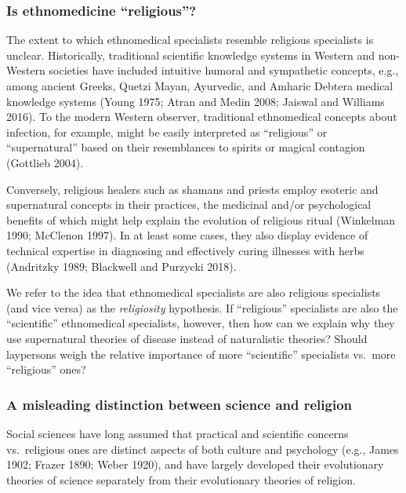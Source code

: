 \documentclass[
  11pt,
]{article}
\begin{document}
\hypertarget{is-ethnomedicine-religious}{%
\subsubsection{Is ethnomedicine ``religious''?}\label{is-ethnomedicine-religious}}

The extent to which ethnomedical specialists resemble religious specialists is unclear. Historically, traditional scientific knowledge systems in Western and non-Western societies have included intuitive humoral and sympathetic concepts, e.g., among ancient Greeks, Quetzi Mayan, Ayurvedic, and Amharic Debtera medical knowledge systems (Young 1975; Atran and Medin 2008; Jaiswal and Williams 2016). To the modern Western observer, traditional ethnomedical concepts about infection, for example, might be easily interpreted as ``religious'' or ``supernatural'' based on their resemblances to spirits or magical contagion (Gottlieb 2004).

Conversely, religious healers such as shamans and priests employ esoteric and supernatural concepts in their practices, the medicinal and/or psychological benefits of which might help explain the evolution of religious ritual (Winkelman 1990; McClenon 1997). In at least some cases, they also display evidence of technical expertise in diagnosing and effectively curing illnesses with herbs (Andritzky 1989; Blackwell and Purzycki 2018).

We refer to the idea that ethnomedical specialists are also religious specialists (and vice versa) as the \emph{religiosity} hypothesis. If ``religious'' specialists are also the ``scientific'' ethnomedical specialists, however, then how can we explain why they use supernatural theories of disease instead of naturalistic theories? Should laypersons weigh the relative importance of more ``scientific'' specialists vs.~more ``religious'' ones?

\hypertarget{a-misleading-distinction-between-science-and-religion}{%
\subsubsection{A misleading distinction between science and religion}\label{a-misleading-distinction-between-science-and-religion}}

Social sciences have long assumed that practical and scientific concerns vs.~religious ones are distinct aspects of both culture and psychology (e.g., James 1902; Frazer 1890; Weber 1920), and have largely developed their evolutionary theories of science separately from their evolutionary theories of religion.
\end{document}
